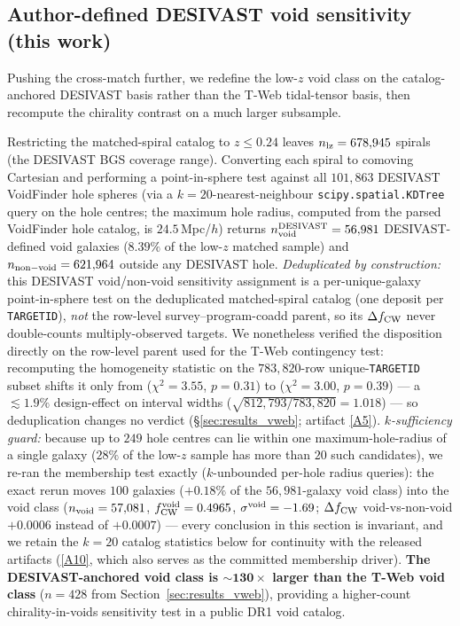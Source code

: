 \documentclass[aps,prd,twocolumn,superscriptaddress,showpacs,preprintnumbers,nofootinbib,longbibliography,floatfix]{revtex4-2}
\newcommand{\repoBase}{https://github.com/Hubify-Projects/bigbounce/blob/main}
\begin{document}
\subsection{Author-defined DESIVAST void sensitivity (this work)}\label{sec:desivast_anchored_void}

Pushing the cross-match further, we redefine the low-$z$ void class on the
catalog-anchored DESIVAST basis rather than the T-Web tidal-tensor
basis, then recompute the chirality contrast on a much larger
subsample.

Restricting the matched-spiral catalog to $z \leq 0.24$ leaves
$n_{\rm lz} = 678{,}945$ spirals (the DESIVAST BGS coverage range).
Converting each spiral to comoving Cartesian and performing a
point-in-sphere test against all $101{,}863$ DESIVAST VoidFinder
hole spheres (via a $k = 20$-nearest-neighbour
\texttt{scipy.spatial.KDTree} query on the hole centres; the maximum
hole radius, computed from the parsed VoidFinder hole catalog, is
$24.5\,$Mpc/$h$) returns
$n_{\rm void}^{\rm DESIVAST} = 56{,}981$ DESIVAST-defined void galaxies
($8.39\%$ of the low-$z$ matched sample) and $n_{\rm non-void} =
621{,}964$ outside any DESIVAST hole.
\emph{Deduplicated by construction:} this DESIVAST void/non-void
sensitivity assignment is a per-unique-galaxy point-in-sphere test on
the deduplicated matched-spiral catalog (one deposit per
\texttt{TARGETID}), \emph{not} the row-level survey--program-coadd
parent, so its $\Delta f_{\rm CW}$ never double-counts multiply-observed
targets. We nonetheless verified the disposition directly on the
row-level parent used for the T-Web contingency test: recomputing the
homogeneity statistic on the $783{,}820$-row unique-\texttt{TARGETID}
subset shifts it only from ($\chi^2\!=\!3.55$, $p\!=\!0.31$) to
($\chi^2\!=\!3.00$, $p\!=\!0.39$) --- a $\lesssim\!1.9\%$ design-effect
on interval widths ($\sqrt{812{,}793/783{,}820}\!=\!1.018$) --- so
deduplication changes no verdict (\S\ref{sec:results_vweb}; artifact
\href{\repoBase/pipelines/p5\_desi\_chirality/outputs/21\_r23conf\_meta\_closures.json}{[A5]}).
\emph{$k$-sufficiency guard:} because up to $249$ hole centres can lie
within one maximum-hole-radius of a single galaxy ($28\%$ of the
low-$z$ sample has more than $20$ such candidates), we re-ran the
membership test exactly ($k$-unbounded per-hole radius queries):
the exact rerun moves $100$ galaxies ($+0.18\%$ of the
$56{,}981$-galaxy void class) into the void class
($n_{\rm void} = 57{,}081$, $f_{\rm CW}^{\rm void} = 0.4965$,
$\sigma^{\rm void} = -1.69$; $\Delta f_{\rm CW}$ void-vs-non-void
$+0.0006$ instead of $+0.0007$) — every conclusion in this section is
invariant, and we retain the $k=20$ catalog statistics below for
continuity with the released artifacts
(\href{\repoBase/pipelines/p5\_desi\_chirality/outputs/17\_v0151\_closure\_recomputes.json}{[A10]},
which also serves as the committed membership driver). \textbf{The DESIVAST-anchored
void class is $\boldsymbol{\sim\!130\times}$ larger than the T-Web void
class} ($n = 428$ from Section~\ref{sec:results_vweb}), providing a
higher-count chirality-in-voids sensitivity test in a public DR1 void
catalog.
\end{document}
